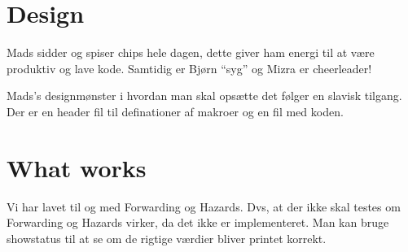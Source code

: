 \documentclass[11pt,a4paper]{report}
\theoremstyle{plain}
\theoremstyle{definition}
\theoremstyle{remark}
\numberwithin{equation}{section}
\begin{document}

\clearpage\maketitle
\thispagestyle{empty}

\clearpage\newpage
\thispagestyle{plain}
\section*{Design}
Mads sidder og spiser chips hele dagen, dette giver ham energi til at være produktiv og lave kode.
Samtidig er Bjørn ``syg'' og Mizra er cheerleader!

Mads's designmønster i hvordan man skal opsætte det følger en slavisk tilgang.
Der er en header fil til definationer af makroer og en fil med koden.
\section*{What works}
Vi har lavet til og med Forwarding og Hazards. Dvs, at der ikke skal testes om Forwarding og Hazards virker, da det ikke er implementeret.
Man kan bruge showstatus til at se om de rigtige værdier bliver printet korrekt.
\end{document}
